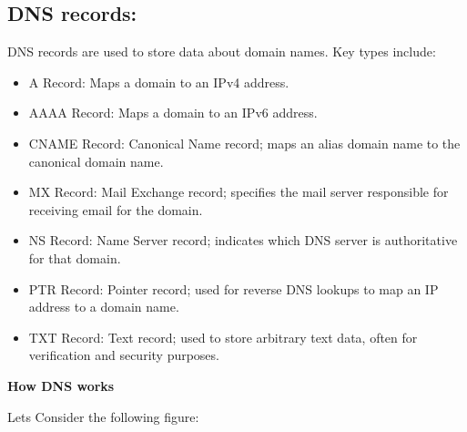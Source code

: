 \subsection{DNS records:}
DNS records are used to store data about domain names. Key types include:\\

\begin{itemize}
	\item A Record: Maps a domain to an IPv4 address.\\
	\item AAAA Record: Maps a domain to an IPv6 address.\\
	
	\item CNAME Record: Canonical Name record; maps an alias domain name to the canonical domain name.\\
	\item MX Record: Mail Exchange record; specifies the mail server responsible for receiving email for the domain.\\
	\item NS Record: Name Server record; indicates which DNS server is authoritative for that domain.\\
	\item PTR Record: Pointer record; used for reverse DNS lookups to map an IP address to a domain name.\\
	\item TXT Record: Text record; used to store arbitrary text data, often for verification and security purposes.
\end{itemize}

\textbf{How DNS works\\}

Lets Consider the following figure:


